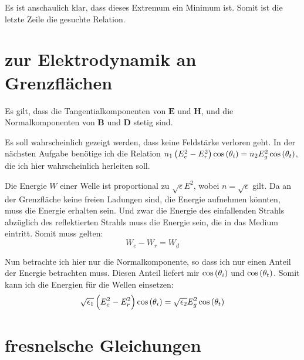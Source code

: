 \documentclass[11pt, ngerman]{article}
\renewcommand{\vec}[1]{\boldsymbol{#1}}
\begin{document}
Es ist anschaulich klar, dass dieses Extremum ein Minimum ist. Somit ist die
letzte Zeile die gesuchte Relation.


\section{zur Elektrodynamik an Grenzflächen}

Es gilt, dass die Tangentialkomponenten von $\vec E$ und $\vec H$, und die
Normalkomponenten von $\vec B$ und $\vec D$ stetig sind.

Es soll wahrscheinlich gezeigt werden, dass keine Feldstärke verloren geht. In
der nächsten Aufgabe benötige ich die Relation $n_1 \del{E_e^2 - E_r^2}
\cos\del{\theta_i} = n_2 E_g^2 \cos\del{\theta_t}$, die ich hier wahrscheinlich
herleiten soll.

Die Energie $W$ einer Welle ist proportional zu $\sqrt{\epsilon} E^2$, wobei $n =
\sqrt{\epsilon}$ gilt. Da an der Grenzfläche keine freien Ladungen sind, die
Energie aufnehmen könnten, muss die Energie erhalten sein. Und zwar die Energie
des einfallenden Strahls abzüglich des reflektierten Strahls muss die Energie sein, die in das Medium eintritt. Somit muss gelten:
\[ W_e - W_r = W_d \]

Nun betrachte ich hier nur die Normalkomponente, so dass ich nur einen Anteil der Energie betrachten muss. Diesen Anteil liefert mir $\cos\del{\theta_i}$ und $\cos\del{\theta_t}$. Somit kann ich die Energien für die Wellen einsetzen:
\[
	\sqrt{\epsilon_1} \del{E_e^2 - E_r^2} \cos\del{\theta_i} = \sqrt{\epsilon_2} E_g^2 \cos\del{\theta_t}
\]


\section{fresnelsche Gleichungen}
\end{document}
